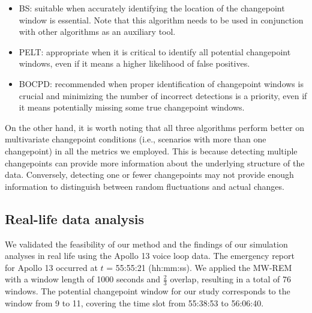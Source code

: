 \documentclass[]{interact}
\theoremstyle{plain}%
\theoremstyle{definition}
\theoremstyle{remark}
\begin{document}
{    \begin{itemize}
    	\item BS: suitable when accurately identifying the location of the changepoint window is essential. Note that this algorithm needs to be used in conjunction with other algorithms as an auxiliary tool. \\
    	
    	\item PELT: appropriate when it is critical to identify all potential changepoint windows, even if it means a higher likelihood of false positives. \\
    	
    	\item BOCPD: recommended when proper identification of changepoint windows is crucial and minimizing the number of incorrect detections is a priority, even if it means potentially missing some true changepoint windows.
    \end{itemize}
    
    On the other hand, it is worth noting that all three algorithms perform better on multivariate changepoint conditions (i.e., scenarios with more than one changepoint) in all the metrics we employed. This is because detecting multiple changepoints can provide more information about the underlying structure of the data. Conversely, detecting one or fewer changepoints may not provide enough information to distinguish between random fluctuations and actual changes\cite{liReviewChangepointDetection2019}.
    
	\subsection{Real-life data analysis} \label{res:Apollo 13}
	
	\hspace{0.28cm} We validated the feasibility of our method and the findings of our simulation analyses in real life using the Apollo 13 voice loop data. The emergency report for Apollo 13 occurred at $t$ = 55:55:21 (hh:mm:ss). We applied the MW-REM with a window length of 1000 seconds and $\frac{2}{3}$ overlap, resulting in a total of 76 windows. The potential changepoint window for our study corresponds to the window from 9 to 11, covering the time slot from 55:38:53 to 56:06:40.
	
}
\end{document}
